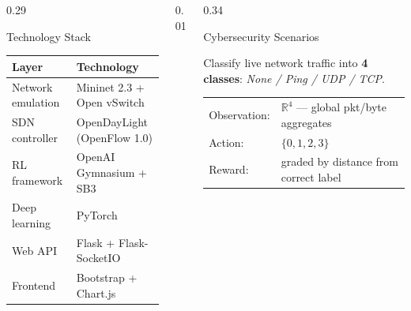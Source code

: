 \documentclass[final]{beamer}
\begin{document}
\begin{frame}[t]
\begin{columns}[T,totalwidth=\textwidth]
\begin{column}{0.29\textwidth}
\begin{block}{Technology Stack}
\large
\setlength{\tabcolsep}{8pt}
\begin{tabular}{@{}ll@{}}
\toprule
\textbf{Layer}        & \textbf{Technology} \\
\midrule
Network emulation     & Mininet 2.3 + Open vSwitch \\
SDN controller        & OpenDayLight (OpenFlow 1.0) \\
RL framework          & OpenAI Gymnasium + SB3 \\
Deep learning         & PyTorch \\
Web API               & Flask + Flask-SocketIO \\
Frontend              & Bootstrap + Chart.js \\
\bottomrule
\end{tabular}
\end{block}

\end{column}

\begin{column}{0.01\textwidth}\end{column}

\begin{column}{0.34\textwidth}

\begin{block}{Cybersecurity Scenarios}
\vspace{0.4cm}

\begin{tcolorbox}[scenbox, title={Scenario 1 \textnormal{—} Traffic Classification}]
\large
Classify live network traffic into \textbf{4 classes}:
\textit{None / Ping / UDP / TCP}.\\[5pt]
\begin{tabular}{@{}ll@{}}
Observation: & $\mathbb{R}^{4}$ — global pkt/byte aggregates \\
Action:      & $\{0,1,2,3\}$ \\
Reward:      & graded by distance from correct label \\
\end{tabular}
\end{tcolorbox}


\end{block}
\end{column}
\end{columns}
\end{frame}
\end{document}
